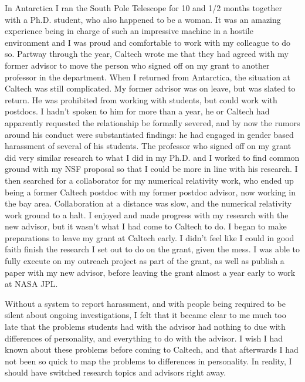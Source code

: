 \documentclass[utf8]{frontiersSCNS} %
\begin{document}
In Antarctica I ran the South Pole Telescope for 10 and 1/2 months together with a Ph.D. student, who also happened to be a woman. It was an amazing experience being in charge of such an impressive machine in a hostile environment and I was proud and comfortable to work with my colleague to do so. Partway through the year, Caltech wrote me that they had agreed with my former advisor to move the person who signed off on my grant to another professor in the department. When I returned from Antarctica, the situation at Caltech was still complicated. My former advisor was on leave, but was slated to return. He was prohibited from working with students, but could work with postdocs. I hadn't spoken to him for more than a year, he or Caltech had apparently requested the relationship be formally severed, and by now the rumors around his conduct were substantiated findings: he had engaged in gender based harassment of several of his students. The professor who signed off on my grant did very similar research to what I did in my Ph.D. and I worked to find common ground with my NSF proposal so that I could be more in line with his research. I then searched for a collaborator for my numerical relativity work, who ended up being a former Caltech postdoc with my former postdoc advisor, now working in the bay area. Collaboration at a distance was slow, and the numerical relativity work ground to a halt. I enjoyed and made progress with my research with the new advisor, but it wasn't what I had come to Caltech to do. I began to make preparations to leave my grant at Caltech early. I didn't feel like I could in good faith finish the research I set out to do on the grant, given the mess. I was able to fully execute on my outreach project as part of the grant, as well as publish a paper with my new advisor, before leaving the grant almost a year early to work at NASA JPL.

Without a system to report harassment, and with people being required to be silent about ongoing investigations, I felt that it became clear to me much too late that the problems students had with the advisor had nothing to due with differences of personality, and everything to do with the advisor. I wish I had known about these problems before coming to Caltech, and that afterwards I had not been so quick to map the problems to differences in personality. In reality, I should have switched research topics and advisors right away. 
\end{document}
